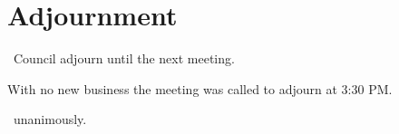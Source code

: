 \section*{Adjournment}

\begin{motion}
    \birt\ Council adjourn until the next meeting.
    \movers{\nickta}{\benjamin}
    
    With no new business the meeting was called to adjourn at 3:30 PM.

    \carries\ unanimously. 
\end{motion}

